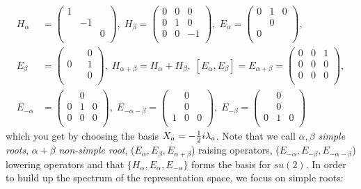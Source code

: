 \begin{align*}
	H_\alpha &=\begin{pmatrix}
	1&&\\
	&-1&\\
	&&0\\
	\end{pmatrix},\;
H_\beta =\begin{pmatrix}
	0&0&0\\
	0&1&0\\
	0&0&-1\\
\end{pmatrix},\;
E_\alpha = \begin{pmatrix}
	0&1&0\\
	&0&\\
	0&&\\
\end{pmatrix},\\
E_\beta &= \begin{pmatrix}
	&&0\\
	0&&1\\
	&&0\\
\end{pmatrix},\;
H_{\alpha+\beta} = H_\alpha+H_\beta,\; [E_\alpha,E_\beta]=E_{\alpha + \beta} = \begin{pmatrix}
	0&0&1\\
	0&0&0\\
	0&0&0\\
\end{pmatrix},\\
E_{-\alpha} &= \begin{pmatrix}
	&0&\\
	0&1&0\\
	0&0&0\\
\end{pmatrix},\;
E_{-\alpha- \beta}= \begin{pmatrix}
	&0&\\&0&\\1&0&0\\
\end{pmatrix}
,\; E_{-\beta} = \begin{pmatrix}
	&0&\\
	&0&\\
	0&1&0\\
\end{pmatrix}
\end{align*}
 which you get by choosing the basis $X_a = -\frac{1}{2} i \lambda_a$. Note that we call $\alpha,\beta$ \emph{simple roots}, $\alpha+\beta$ \emph{non-simple root}, ($E_\alpha,E_\beta,E_{\alpha+\beta}$) raising operators, ($E_{-\alpha},E_{-\beta},E_{-\alpha-\beta}$) lowering operators and that $\{H_\alpha,E_\alpha,E_{-\alpha}\}$ forms the basis for $su(2)$. In order to build up the spectrum of the representation space, we focus on simple roots: \\
